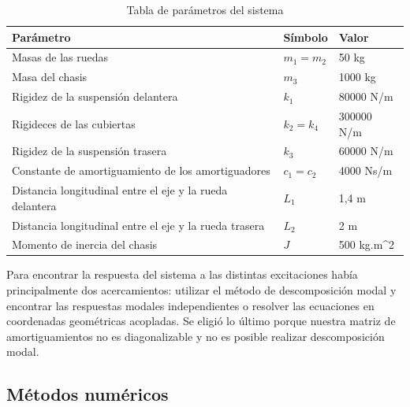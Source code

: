 \documentclass[oneside, a4paper, spanish, links]{amca}
\begin{document}
\begin{table}[h]
\begin{tabular}{|l|l|l|}
\hline
\textbf{Parámetro}                                       & \textbf{Símbolo} & \textbf{Valor}                \\ \hline
Masas de las ruedas                                      & $m_1 = m_2$          & 50 kg                       \\ \hline
Masa del chasis                                          & $m_3$                & 1000 kg                     \\ \hline
Rigidez de la suspensión delantera                       & $k_1$                & 80000 N/m                   \\ \hline
Rigideces de las cubiertas                               & $k_2 = k_4$          & 300000 N/m                  \\ \hline
Rigidez de la suspensión trasera                         & $k_3$                & 60000 N/m                   \\ \hline
Constante de amortiguamiento de los amortiguadores       & $c_1 = c_2$          & 4000 Ns/m                   \\ \hline
Distancia longitudinal entre el eje y la rueda delantera & $L_1$                & 1,4 m                       \\ \hline
Distancia longitudinal entre el eje y la rueda trasera   & $L_2$                & 2 m                         \\ \hline
Momento de inercia del chasis                            & $J$                  & 500 kg.m^2                 \\ \hline
\end{tabular}
\caption{Tabla de parámetros del sistema}
\label{tab: parametros}
\end{table}

Para encontrar la respuesta del sistema a las distintas excitaciones había principalmente dos acercamientos: utilizar el método de descomposición modal y encontrar las respuestas modales independientes o resolver las ecuaciones en coordenadas geométricas acopladas. Se eligió lo último porque nuestra matriz de amortiguamientos no es diagonalizable y no es posible realizar descomposición modal. 


\subsection{Métodos numéricos}
\end{document}
